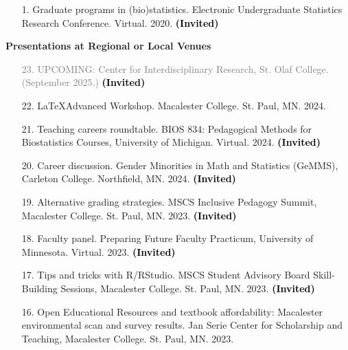 \documentclass[margin]{res}
\newcommand{\annotate}[1]{\textcolor{black}{\textbf{(#1)}}}
\begin{document}
\begin{resume}
\begin{itemize}
\item[1.] Graduate programs in (bio)statistics. 
Electronic Undergraduate Statistics Research Conference. Virtual. 2020. 
\annotate{Invited}

\end{itemize}


\textbf{Presentations at Regional or Local Venues}

\begin{itemize}

\item[\textcolor{gray}{23.}] \textcolor{gray}{UPCOMING: 
Center for Interdisciplinary Research, St. Olaf College. (September 2025.) 
\annotate{Invited}}

\item[22.] %
\LaTeX Advanced Workshop. 
Macalester College. St. Paul, MN. 2024. %

\item[21.] Teaching careers roundtable. 
BIOS 834: Pedagogical Methods for Biostatistics Courses, University of Michigan.  Virtual.  2024. 
\annotate{Invited}

\item[20.] Career discussion.
Gender Minorities in Math and Statistics (GeMMS), Carleton College. Northfield, MN. 2024. 
\annotate{Invited}

\item[19.] Alternative grading strategies. 
MSCS Inclusive Pedagogy Summit, Macalester College. St. Paul, MN. 2023.  
\annotate{Invited}

\item[18.] Faculty panel.  
Preparing Future Faculty Practicum, University of Minnesota. Virtual. 2023. 
\annotate{Invited}

\item[17.] Tips and tricks with R/RStudio.  
MSCS Student Advisory Board Skill-Building Sessions, Macalester College. St. Paul, MN. 2023. 
\annotate{Invited}

\item[16.] Open Educational Resources and textbook affordability: Macalester environmental scan and survey results.  
Jan Serie Center for Scholarship and Teaching, Macalester College. St. Paul, MN. 2023.



\end{itemize}
\end{resume}
\end{document}
